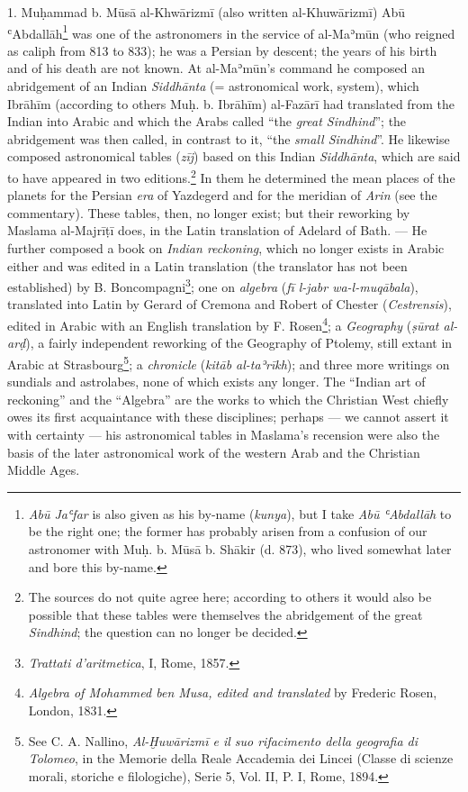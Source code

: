 \documentclass[11pt]{article}
\newcommand{\Pg}[1]{\marginpar{\footnotesize\color{gray}#1}}
\begin{document}
\par 1. Muḥammad b. Mūsā al-Khwārizmī (also written al-Khuwārizmī) Abū ʿAbdallāh\footnote{\emph{Abū Jaʿfar} is also given as his by-name (\emph{kunya}), but I take \emph{Abū ʿAbdallāh} to be the right one; the former has probably arisen from a confusion of our astronomer with Muḥ. b. Mūsā b. Shākir (d. 873), who lived somewhat later and bore this by-name.} was one of the astronomers in the service of al-Maʾmūn (who reigned as caliph from 813 to 833); he was a Persian by descent; the years of his birth and of his death are not known. At al-Maʾmūn's command he composed an abridgement of an Indian \emph{Siddhānta} (= astronomical work, system), which Ibrāhīm (according to others Muḥ. b. Ibrāhīm) al-Fazārī had translated from the Indian into Arabic and which the Arabs called “the \emph{great Sindhind}”; the abridgement was then called, in contrast to it, “the \emph{small Sindhind}”. He likewise composed astronomical tables (\emph{zīj}) based on this Indian \emph{Siddhānta}, which are said to have appeared in two editions.\footnote{The sources do not quite agree here; according to others it would also be possible that these tables were themselves the abridgement of the great \emph{Sindhind}; the question can no longer be decided.} In them he determined the mean places of the planets for the Persian \emph{era} of Yazdegerd and for the meridian of \emph{Arin} (see the commentary). These tables, then, no longer exist; but their reworking by Maslama al-Majrīṭī does, in the Latin translation of Adelard of Bath. — He further composed a book on \emph{Indian reckoning}, which no longer exists in Arabic either and was edited in a Latin translation (the translator has not been established) by B. Boncompagni\footnote{\emph{Trattati d’aritmetica}, I, Rome, 1857.}; one on \emph{algebra} (\emph{fī l-jabr wa-l-muqābala}), translated into Latin by Gerard of Cremona and Robert of Chester (\emph{Cestrensis}), edited in Arabic with an English translation by F. Rosen\footnote{\emph{Algebra of Mohammed ben Musa, edited and translated} by Frederic Rosen, London, 1831.}; a \emph{Geography} \Pg{IX}(\emph{ṣūrat al-arḍ}), a fairly independent reworking of the Geography of Ptolemy, still extant in Arabic at Strasbourg\footnote{See C. A. Nallino, \emph{Al-Ḫuwārizmī e il suo rifacimento della geografia di Tolomeo}, in the Memorie della Reale Accademia dei Lincei (Classe di scienze morali, storiche e filologiche), Serie 5, Vol. II, P. I, Rome, 1894.}; a \emph{chronicle} (\emph{kitāb al-taʾrīkh}); and three more writings on sundials and astrolabes, none of which exists any longer. The “Indian art of reckoning” and the “Algebra” are the works to which the Christian West chiefly owes its first acquaintance with these disciplines; perhaps — we cannot assert it with certainty — his astronomical tables in Maslama's recension were also the basis of the later astronomical work of the western Arab and the Christian Middle Ages.\par
\end{document}
